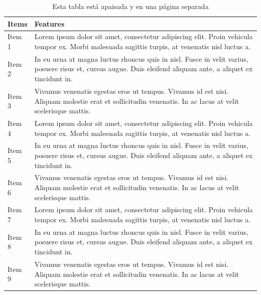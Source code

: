 \documentclass[12pt,a4paper,]{book}
\numberwithin{dummy}{section}
\theoremstyle{ocrenumbox}
\theoremstyle{blacknumex}
\theoremstyle{blacknumbox}
\theoremstyle{ocrenum}
\theoremstyle{ocrenum}
\begin{document}
\begin{landscape}\begin{table}

\caption{\label{tab:unnamed-chunk-21}\label{tab:apaisada}Esta tabla 
          est\'a apaisada y en una p\'agina separada}
\centering
\begin{tabular}[t]{>{\raggedright\arraybackslash}p{2cm}>{\raggedright\arraybackslash}p{10cm}}
\toprule
Items & Features\\
\midrule
Item 1 & Lorem ipsum dolor sit amet, consectetur adipiscing elit.
    Proin vehicula tempor ex. Morbi malesuada sagittis turpis,
    at venenatis nisl luctus \vphantom{2} a.\\
Item 2 & In eu urna at magna luctus rhoncus quis in nisl. Fusce in velit
    varius, posuere risus et, cursus augue. Duis eleifend aliquam ante,
    a aliquet ex tincidunt \vphantom{2} in.\\
Item 3 & Vivamus venenatis egestas eros ut tempus. Vivamus id est nisi.
    Aliquam molestie erat et sollicitudin venenatis. In ac lacus at
    velit scelerisque \vphantom{2} mattis.\\
Item 4 & Lorem ipsum dolor sit amet, consectetur adipiscing elit.
    Proin vehicula tempor ex. Morbi malesuada sagittis turpis,
    at venenatis nisl luctus \vphantom{1} a.\\
Item 5 & In eu urna at magna luctus rhoncus quis in nisl. Fusce in velit
    varius, posuere risus et, cursus augue. Duis eleifend aliquam ante,
    a aliquet ex tincidunt \vphantom{1} in.\\
\addlinespace
Item 6 & Vivamus venenatis egestas eros ut tempus. Vivamus id est nisi.
    Aliquam molestie erat et sollicitudin venenatis. In ac lacus at
    velit scelerisque \vphantom{1} mattis.\\
Item 7 & Lorem ipsum dolor sit amet, consectetur adipiscing elit.
    Proin vehicula tempor ex. Morbi malesuada sagittis turpis,
    at venenatis nisl luctus a.\\
Item 8 & In eu urna at magna luctus rhoncus quis in nisl. Fusce in velit
    varius, posuere risus et, cursus augue. Duis eleifend aliquam ante,
    a aliquet ex tincidunt in.\\
Item 9 & Vivamus venenatis egestas eros ut tempus. Vivamus id est nisi.
    Aliquam molestie erat et sollicitudin venenatis. In ac lacus at
    velit scelerisque mattis.\\
\bottomrule
\end{tabular}
\end{table}
\end{landscape}
\end{document}
